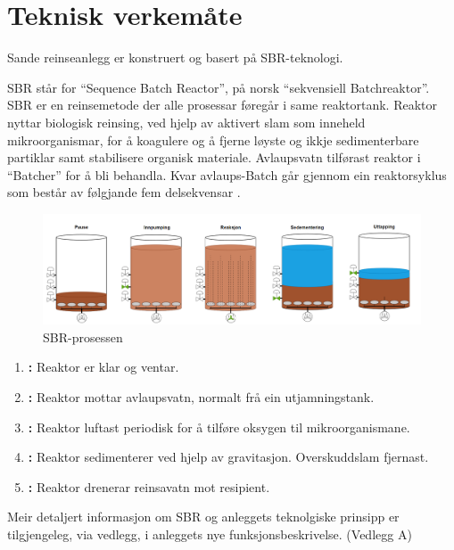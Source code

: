 \newpage
\section{Teknisk verkemåte}
\thispagestyle{fancy}
Sande reinseanlegg er konstruert og basert på \gls{SBR}-teknologi.

\gls{SBR} står for ``Sequence \Gls{Batch} Reactor'', på norsk ``sekvensiell \gls{Batch}reaktor''.\newline
\gls{SBR} er en reinsemetode der alle prosessar føregår i same reaktortank. 
Reaktor nyttar biologisk reinsing, ved hjelp av aktivert slam som inneheld mikroorganismar, for å koagulere 
og å fjerne løyste og ikkje sedimenterbare partiklar samt stabilisere organisk materiale. 
Avlaupsvatn tilførast reaktor i ``\gls{Batch}er'' for å bli behandla. 
Kvar avlaups-\gls{Batch} går gjennom ein reaktorsyklus som består av følgjande fem delsekvensar \citep{Statsforvalter}.
\newline

\begin{figure}[htbp]
    \centering
    \includegraphics[width=1\textwidth]{Figurar/SBR-V2.png}
    \caption{\gls{SBR}-prosessen}\label{fig:SBR-Prosessen}
\end{figure}


\begin{enumerate}
    \item \textbf{:} Reaktor er klar og ventar.
    \item \textbf{:} Reaktor mottar avlaupsvatn, normalt frå ein utjamningstank.
    \item \textbf{:} Reaktor luftast periodisk for å tilføre oksygen til mikroorganismane.
    \item \textbf{:} Reaktor sedimenterer ved hjelp av gravitasjon. Overskuddslam fjernast.
    \item \textbf{:} Reaktor drenerar reinsavatn mot resipient.
\end{enumerate}

Meir detaljert informasjon om \gls{SBR} og anleggets teknolgiske prinsipp er tilgjengeleg, via vedlegg, i anleggets nye
funksjonsbeskrivelse. (Vedlegg A)

